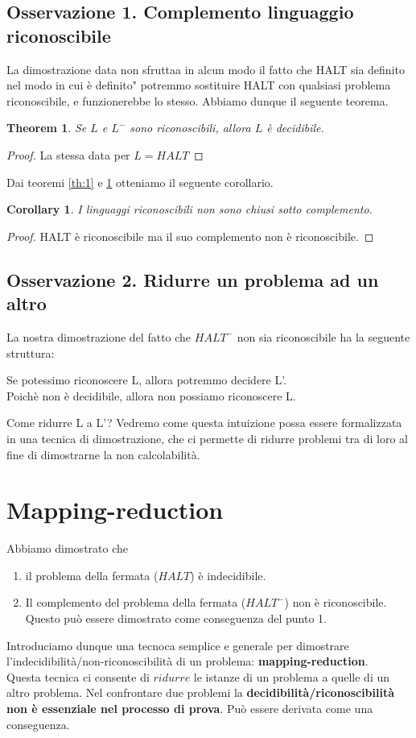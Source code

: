 \documentclass[a4paper, 12pt]{article}
\newtheorem{theorem}{Theorem}[section]
\newtheorem{corollary}{Corollary}[theorem]
\begin{document}
\subsection{Osservazione 1. Complemento linguaggio riconoscibile}
La dimostrazione data non sfruttaa in alcun modo il fatto che HALT sia definito nel modo in cui \`e definito" potremmo sostituire HALT con qualsiasi problema riconoscibile, e funzionerebbe lo stesso. Abbiamo dunque il seguente teorema.
\begin{theorem}
\label{th:2}
Se $L$ e $L^{-}$ sono riconoscibili, allora $L$ \`e decidibile.
\end{theorem}
\begin{proof}
La stessa data per $L = HALT$
\end{proof}
Dai teoremi \ref{th:1} e \ref{th:2} otteniamo il seguente corollario.
\begin{corollary}
I linguaggi riconoscibili non sono chiusi sotto complemento.
\end{corollary}
\begin{proof}
HALT \`e riconoscibile ma il suo complemento non \`e riconoscibile.
\end{proof}
\subsection{Osservazione 2. Ridurre un problema ad un altro}
La nostra dimostrazione del fatto che $HALT^{-}$ non sia riconoscibile ha la seguente struttura:
\begin{center}
Se potessimo riconoscere L, allora potremmo decidere L'.\\ Poich\`e non \`e decidibile, allora non possiamo riconoscere L.
\end{center}
Come ridurre L a L'? Vedremo come questa intuizione possa essere formalizzata in una tecnica di dimostrazione, che ci permette di ridurre problemi tra di loro al fine di dimostrarne la non calcolabilit\`a.

\section{Mapping-reduction}
Abbiamo dimostrato che 
\begin{enumerate}
\item il problema della fermata ($HALT$) \`e indecidibile.
\item Il complemento del problema della fermata ($HALT^{-}$) non \`e riconoscibile. Questo pu\`o essere dimostrato come conseguenza del punto 1.
\end{enumerate}
Introduciamo dunque una tecnoca semplice e generale per dimostrare l'indecidibilit\`a/non-riconoscibilit\`a di un problema: \textbf{mapping-reduction}.\\
Questa tecnica ci consente di $ridurre$ le istanze di un problema a quelle di un altro problema. Nel confrontare due problemi la \textbf{decidibilit\`a/riconoscibilit\`a non \`e essenziale nel processo di prova}. Pu\`o essere derivata come una conseguenza.
\end{document}
